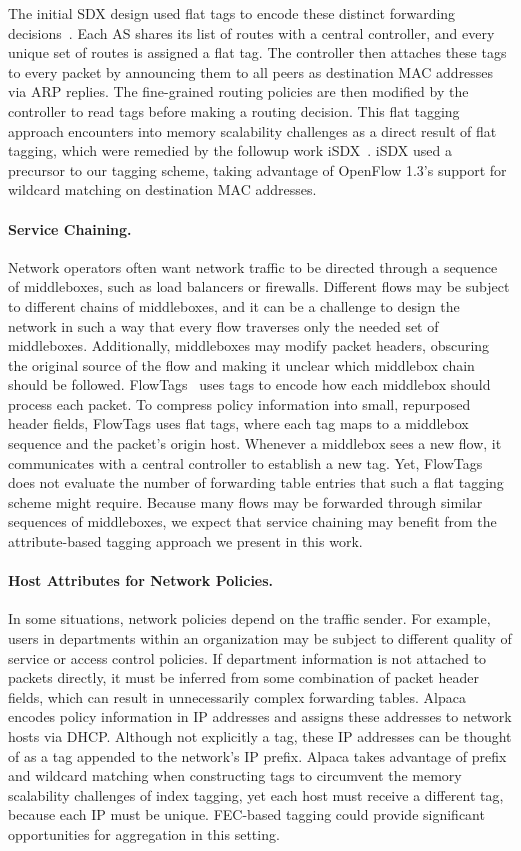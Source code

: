 The initial SDX design used flat tags to encode these distinct
forwarding decisions~\cite{sdx}. Each AS shares its list of routes with
a central controller, and every unique set of routes is assigned a flat
tag. The controller then attaches these tags to every packet by
announcing them to all peers as destination MAC addresses via ARP
replies. The fine-grained routing policies are then modified by the
controller to read tags before making a routing decision.  This flat
tagging approach encounters into memory scalability challenges as a
direct result of flat tagging, which were remedied by the followup work
iSDX~\cite{isdx}. iSDX used a precursor to our tagging scheme, taking
advantage of OpenFlow 1.3's support for wildcard matching on destination
MAC addresses.

\paragraph{Service Chaining.}
Network operators often want network traffic to be directed through a
sequence of middleboxes, such as load balancers or firewalls.  Different
flows may be subject to different chains of middleboxes, and it can be a
challenge to design the network in such a way that every flow traverses
only the needed set of middleboxes. Additionally, middleboxes may modify
packet headers, obscuring the original source of the flow and making it
unclear which middlebox chain should be followed.
FlowTags~\cite{flowtags} uses tags to encode how each middlebox should
process each packet. To compress policy information into small,
repurposed header fields, FlowTags uses flat tags, where each tag maps
to a middlebox sequence and the packet's origin host. Whenever a
middlebox sees a new flow, it communicates with a central controller to
establish a new tag.  Yet, FlowTags does not evaluate the number of
forwarding table entries that such a flat tagging scheme might
require. Because many flows may be forwarded through similar sequences
of middleboxes, we expect that service chaining may benefit from the
attribute-based tagging approach we present in this work.
 

\paragraph{Host Attributes for Network Policies.}
In some situations, network policies depend on the traffic sender.  For
example, users in departments within an organization may be subject
to different quality of service or access control policies. If
department information is not attached to packets directly, it must be
inferred from some combination of packet header fields, which can result
in unnecessarily complex forwarding tables.  Alpaca~\cite{alpaca}
encodes policy information in IP addresses and assigns these addresses
to network hosts via DHCP. Although not explicitly a tag, these IP
addresses can be thought of as a tag appended to the network's IP
prefix. Alpaca takes advantage of prefix and wildcard matching when
constructing tags to circumvent the memory scalability challenges of
index tagging, yet each host must receive a different tag, because each
IP must be unique. FEC-based tagging could provide significant
opportunities for aggregation in this setting.


